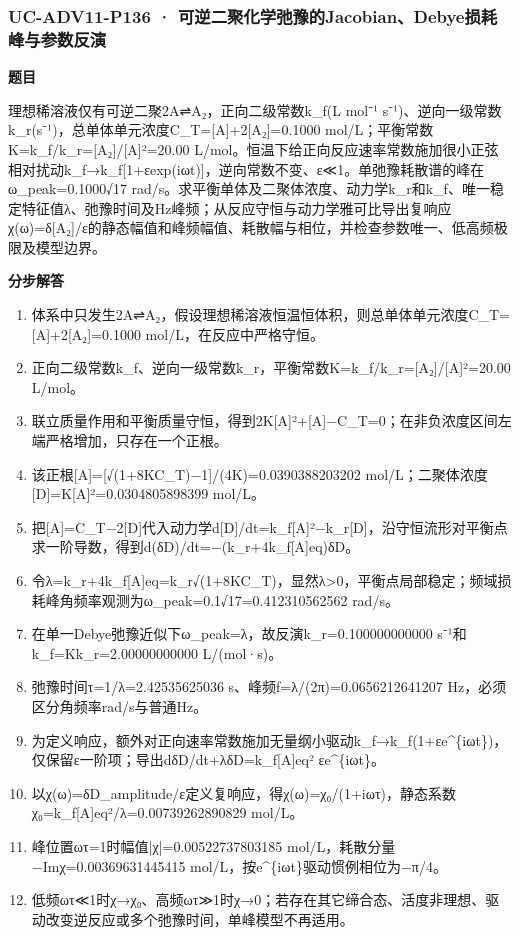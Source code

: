 \documentclass[UTF8,11pt,a4paper]{ctexart}
\begin{document}
\subsubsection*{UC-ADV11-P136 · 可逆二聚化学弛豫的Jacobian、Debye损耗峰与参数反演}
\noindent\textbf{题目}\par
理想稀溶液仅有可逆二聚2A⇌A₂，正向二级常数k\_f(L mol⁻¹ s⁻¹)、逆向一级常数k\_r(s⁻¹)，总单体单元浓度C\_T=[A]+2[A₂]=0.1000 mol/L；平衡常数K=k\_f/k\_r=[A₂]/[A]²=20.00 L/mol。恒温下给正向反应速率常数施加很小正弦相对扰动k\_f→k\_f[1+εexp(iωt)]，逆向常数不变、ε≪1。单弛豫耗散谱的峰在ω\_peak=0.1000√17 rad/s。求平衡单体及二聚体浓度、动力学k\_r和k\_f、唯一稳定特征值λ、弛豫时间及Hz峰频；从反应守恒与动力学雅可比导出复响应χ(ω)=δ[A₂]/ε的静态幅值和峰频幅值、耗散幅与相位，并检查参数唯一、低高频极限及模型边界。\par
\medskip\noindent\textbf{分步解答}
\begin{enumerate}
\item 体系中只发生2A⇌A₂，假设理想稀溶液恒温恒体积，则总单体单元浓度C\_T=[A]+2[A₂]=0.1000 mol/L，在反应中严格守恒。
\item 正向二级常数k\_f、逆向一级常数k\_r，平衡常数K=k\_f/k\_r=[A₂]/[A]²=20.00 L/mol。
\item 联立质量作用和平衡质量守恒，得到2K[A]²+[A]−C\_T=0；在非负浓度区间左端严格增加，只存在一个正根。
\item 该正根[A]=[√(1+8KC\_T)−1]/(4K)=0.0390388203202 mol/L；二聚体浓度[D]=K[A]²=0.0304805898399 mol/L。
\item 把[A]=C\_T−2[D]代入动力学d[D]/dt=k\_f[A]²−k\_r[D]，沿守恒流形对平衡点求一阶导数，得到d(δD)/dt=−(k\_r+4k\_f[A]eq)δD。
\item 令λ=k\_r+4k\_f[A]eq=k\_r√(1+8KC\_T)，显然λ>0，平衡点局部稳定；频域损耗峰角频率观测为ω\_peak=0.1√17=0.412310562562 rad/s。
\item 在单一Debye弛豫近似下ω\_peak=λ，故反演k\_r=0.100000000000 s⁻¹和k\_f=Kk\_r=2.00000000000 L/(mol·s)。
\item 弛豫时间τ=1/λ=2.42535625036 s、峰频f=λ/(2π)=0.0656212641207 Hz，必须区分角频率rad/s与普通Hz。
\item 为定义响应，额外对正向速率常数施加无量纲小驱动k\_f→k\_f(1+εe\textasciicircum{}\{iωt\})，仅保留ε一阶项；导出dδD/dt+λδD=k\_f[A]eq² εe\textasciicircum{}\{iωt\}。
\item 以χ(ω)=δD\_amplitude/ε定义复响应，得χ(ω)=χ₀/(1+iωτ)，静态系数χ₀=k\_f[A]eq²/λ=0.00739262890829 mol/L。
\item 峰位置ωτ=1时幅值|χ|=0.00522737803185 mol/L，耗散分量−Imχ=0.00369631445415 mol/L，按e\textasciicircum{}\{iωt\}驱动惯例相位为−π/4。
\item 低频ωτ≪1时χ→χ₀、高频ωτ≫1时χ→0；若存在其它缔合态、活度非理想、驱动改变逆反应或多个弛豫时间，单峰模型不再适用。
\end{enumerate}
\end{document}
